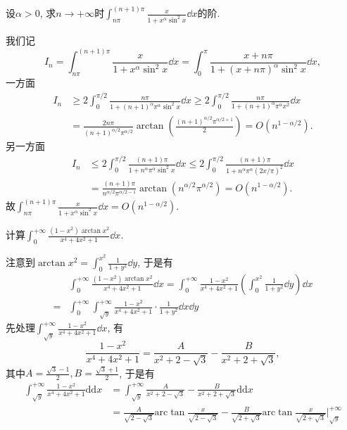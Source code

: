 \begin{quizb}
\woe 设\(\alpha>0\), 求\(n\rightarrow+\infty\)时\(\int_{n\pi}^{(n+1)\pi}\frac{x}{1+x^\alpha\sin^2x}\dd x\)的阶.
\begin{solution}
我们记\[I_n=\int_{n\pi}^{(n+1)\pi}\frac{x}{1+x^\alpha\sin^2x}\dd x=\int_{0}^{\pi}\frac{x+n\pi}{1+(x+n\pi)^\alpha\sin^2x}\dd x,\]一方面\[\begin{split}
I_n&\geqslant 2\int_{0}^{\pi/2}\frac{n\pi}{1+(n+1)^\alpha\pi^\alpha\sin^2x}\dd x\geqslant 2\int_{0}^{\pi/2}\frac{n\pi}{1+(n+1)^\alpha\pi^\alpha x^2}\dd x\\&=\frac{2n\pi}{(n+1)^{\alpha/2}\pi^{\alpha/2}}\arctan\left(\frac{(n+1)^{\alpha/2}\pi^{\alpha/2+1}}{2}\right)=O(n^{1-\alpha/2}).
\end{split}\]另一方面\[\begin{split}
I_n&\leqslant 2\int_{0}^{\pi/2}\frac{(n+1)\pi}{1+n^\alpha\pi^{\alpha}\sin^2x}\dd x\leqslant 2\int_{0}^{\pi/2}\frac{(n+1)\pi}{1+n^{\alpha}\pi^{\alpha}(2x/\pi)^2}\dd x\\
&=\frac{(n+1)\pi}{n^{\alpha/2}\pi^{\alpha/2-1}}\arctan(n^{\alpha/2}\pi^{\alpha/2})=O(n^{1-\alpha/2}).\end{split}\]
故\(\int_{n\pi}^{(n+1)\pi}\frac{x}{1+x^\alpha\sin^2x}\dd x=O(n^{1-\alpha/2})\).
\end{solution}
\woe 计算\(\int_{0}^{+\infty}\frac{(1-x^2)\arctan x^2}{x^4+4x^2+1}\dd x.\)
\begin{solution}
注意到\(\arctan x^2=\int_{0}^{x^2}\frac{1}{1+y^2}\dd y\), 于是有\[\begin{split}
&\int_{0}^{+\infty}\frac{(1-x^2)\arctan x^2}{x^4+4x^2+1}\dd x=\int_{0}^{+\infty}\frac{1-x^2}{x^4+4x^2+1}\left(\int_{0}^{x^2}\frac{1}{1+y^2}\dd y\right)\dd x\\=&\int_{0}^{+\infty}\int_{\sqrt{y}}^{+\infty}\frac{1-x^2}{x^4+4x^2+1}\cdot\frac{1}{1+y^2}\dd x\dd y
\end{split}\]
先处理\(\int_{\sqrt{y}}^{+\infty}\frac{1-x^2}{x^4+4x^2+1}\dd x\), 有\[\frac{1-x^2}{x^4+4x^2+1}=\frac{A}{x^2+2-\sqrt{3}}-\frac{B}{x^2+2+\sqrt{3}},\]其中\(A=\frac{\sqrt{3}-1}{2},B=\frac{\sqrt{3}+1}{2}\), 于是有
\[\begin{aligned}
	\int_{\sqrt{y}}^{+\infty}{\frac{1-x^2}{x^4+4x^2+1}}\mathrm{dd}x&=\int_{\sqrt{y}}^{+\infty}{\frac{A}{x^2+2-\sqrt{3}}}-\frac{B}{x^2+2+\sqrt{3}}\mathrm{dd}x\\
	&=\frac{A}{\sqrt{2-\sqrt{3}}}\mathrm{arc}\tan \frac{x}{\sqrt{2-\sqrt{3}}}-\frac{B}{\sqrt{2+\sqrt{3}}}\mathrm{arc}\tan \frac{x}{\sqrt{2+\sqrt{3}}}|_{\sqrt{y}}^{+\infty}\\

\end{aligned}\]
\end{solution}
\end{quizb}
